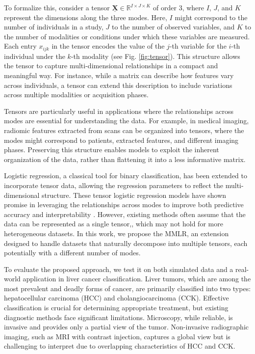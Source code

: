 \documentclass[preprint,12pt]{elsarticle}
\begin{document}
To formalize this, consider a tensor \(\underline{\mathbf{X}} \in \mathbb{R}^{I \times J \times K}\) of order 3, where \(I\), \(J\), and \(K\) represent the dimensions along the three modes. Here, \(I\) might correspond to the number of individuals in a study, \(J\) to the number of observed variables, and \(K\) to the number of modalities or conditions under which these variables are measured. Each entry \(x_{ijk}\) in the tensor encodes the value of the \(j\)-th variable for the \(i\)-th individual under the \(k\)-th modality (see Fig. \ref{fig:tensor}). This structure allows the tensor to capture multi-dimensional relationships in a compact and meaningful way. For instance, while a matrix can describe how features vary across individuals, a tensor can extend this description to include variations across multiple modalities or acquisition phases. 

Tensors are particularly useful in applications where the relationships across modes are essential for understanding the data. For example, in medical imaging, radiomic features extracted from scans can be organized into tensors, where the modes might correspond to patients, extracted features, and different imaging phases. Preserving this structure enables models to exploit the inherent organization of the data, rather than flattening it into a less informative matrix.

Logistic regression, a classical tool for binary classification, has been extended to incorporate tensor data, allowing the regression parameters to reflect the multi-dimensional structure. These tensor logistic regression models have shown promise in leveraging the relationships across modes to improve both predictive accuracy and interpretability \cite{multi_rank_1, multi_rank_r}. However, existing methods often assume that the data can be represented as a single tensor,, which may not hold for more heterogeneous datasets. In this work, we propose the MMLR, an extension designed to handle datasets that naturally decompose into multiple tensors, each potentially with a different number of modes.

To evaluate the proposed approach, we test it on both simulated data and a real-world application in liver cancer classification. Liver tumors, which are among the most prevalent and deadly forms of cancer, are primarily classified into two types: hepatocellular carcinoma (HCC) and cholangiocarcinoma (CCK). Effective classification is crucial for determining appropriate treatment, but existing diagnostic methods face significant limitations. Microscopy, while reliable, is invasive and provides only a partial view of the tumor. Non-invasive radiographic imaging, such as MRI with contrast injection, captures a global view but is challenging to interpret due to overlapping characteristics of HCC and CCK. 
\end{document}
